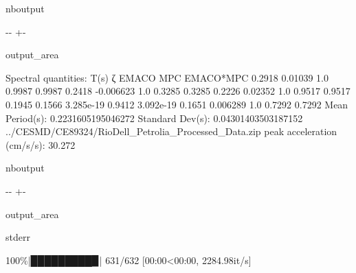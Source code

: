 \documentclass[letterpaper,10pt,english]{sphinxmanual}
\begin{document}
\begin{sphinxuseclass}{nboutput}
{

\kern-\sphinxverbatimsmallskipamount\kern-\baselineskip
\kern+\FrameHeightAdjust\kern-\fboxrule
\vspace{\nbsphinxcodecellspacing}

\begin{sphinxuseclass}{output_area}
\begin{sphinxuseclass}{}


\begin{sphinxVerbatim}[commandchars=\\\{\}]
Spectral quantities:
       T(s)        ζ        EMACO        MPC     EMACO*MPC
      0.2918     0.01039    1.0        0.9987     0.9987
      0.2418     -0.006623  1.0        0.3285     0.3285
      0.2226     0.02352    1.0        0.9517     0.9517
      0.1945     0.1566     3.285e-19  0.9412     3.092e-19
      0.1651     0.006289   1.0        0.7292     0.7292
Mean Period(s): 0.2231605195046272
Standard Dev(s): 0.04301403503187152
../CESMD/CE89324/RioDell\_Petrolia\_Processed\_Data.zip
peak acceleration (cm/s/s): 30.272
\end{sphinxVerbatim}



\end{sphinxuseclass}
\end{sphinxuseclass}
}

\end{sphinxuseclass}
\begin{sphinxuseclass}{nboutput}
{

\kern-\sphinxverbatimsmallskipamount\kern-\baselineskip
\kern+\FrameHeightAdjust\kern-\fboxrule
\vspace{\nbsphinxcodecellspacing}

\begin{sphinxuseclass}{output_area}
\begin{sphinxuseclass}{stderr}


\begin{sphinxVerbatim}[commandchars=\\\{\}]
100\%|█████████▉| 631/632 [00:00<00:00, 2284.98it/s]
\end{sphinxVerbatim}



\end{sphinxuseclass}
\end{sphinxuseclass}
}

\end{sphinxuseclass}
\end{document}
